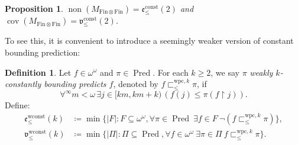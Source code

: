 \documentclass[a4paper,12pt]{amsart}
\newtheorem{prop}[thm]{Proposition}
\theoremstyle{definition}
\newtheorem{dfn}[thm]{Definition}
\numberwithin{thm}{section}
\numberwithin{equation}{section}
\newcommand{\oo}{{\omega}^\omega}
\newcommand{\ee}{\mathfrak{e}}
\DeclareMathOperator{\non}{non}
\DeclareMathOperator{\cov}{cov}
\DeclareMathOperator{\Pred}{Pred}
\newcommand{\finfin}{\mathrm{Fin}\otimes\mathrm{Fin}}
\newcommand{\vv}{\mathfrak{v}}
\begin{document}
    \begin{prop}\label{prop:non_M_finfin}
        $\non(M_{\finfin}) = \ee^\mathrm{const}_{\leq}(2)$ and $\cov(M_{\finfin}) = \vv^{\mathrm{const}}_{\leq}(2)$.
    \end{prop}
    
    To see this, it is convenient to introduce a seemingly weaker version of constant bounding prediction:
    
    \begin{dfn}
        Let $f\in\oo$ and $\pi\in\Pred$. For each $k\geq 2$, we say $\pi$ \emph{weakly $k$-constantly bounding predicts $f$}, denoted by $f\sqsubset^{\mathrm{wpc}, k}_{\leq}\pi$, if
        \[
        \forall^\infty m<\omega\,\exists j\in[km, km+k)\,(f(j)\leq\pi(f\upharpoonright j)).
        \]
        Define:
        \begin{align*}
			\ee^\mathrm{wconst}_{\leq}(k) &\coloneqq\min\{|F|:F\subseteq\oo,\forall \pi\in \Pred~\exists f\in F~ \lnot(f\sqsubset^{\mathrm{wpc}, k}_{\leq}\pi)\},\\
			\vv^\mathrm{wconst}_{\leq}(k) &\coloneqq\min\{|\Pi|:\Pi\subseteq \Pred,\forall f\in\oo~\exists\pi\in \Pi~ f \sqsubset^{\mathrm{wpc}, k}_{\leq} \pi\}.\\
		\end{align*}
    \end{dfn}
    
\end{document}
